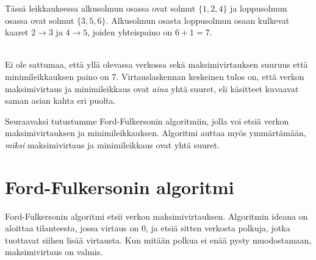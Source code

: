 \begin{center}
\end{center}

Tässä leikkauksessa alkusolmun osassa ovat solmut $\{1,2,4\}$
ja loppusolmun osassa ovat solmut $\{3,5,6\}$.
Alkusolmun osasta loppusolmun osaan kulkevat
kaaret $2 \rightarrow 3$ ja $4 \rightarrow 5$,
joiden yhteispaino on $6+1=7$.

~\\
\noindent
Ei ole sattumaa, että yllä olevassa verkossa
sekä maksimivirtauksen suuruus
että minimileikkauksen paino on 7.
Virtauslaskennan keskeinen tulos on,
että verkon maksimivirtaus ja
minimileikkaus
ovat \textit{aina} yhtä suuret,
eli käsitteet kuvaavat saman asian
kahta eri puolta.

Seuraavaksi tutustumme Ford-Fulkersonin
algoritmiin, jolla voi etsiä verkon
maksimivirtauksen ja
minimileikkauksen.
Algoritmi auttaa myös ymmärtämään,
\textit{miksi} maksimivirtaus ja
minimileikkaus ovat yhtä suuret.

\section{Ford-Fulkersonin algoritmi}

Ford-Fulkersonin algoritmi etsii verkon maksimivirtauksen.
Algoritmin ideana on aloittaa tilanteesta,
jossa virtaus on 0, ja etsiä sitten verkosta polkuja,
jotka tuottavat siihen lisää virtausta.
Kun mitään polkua ei enää pysty muodostamaan,
maksimivirtaus on valmis.

